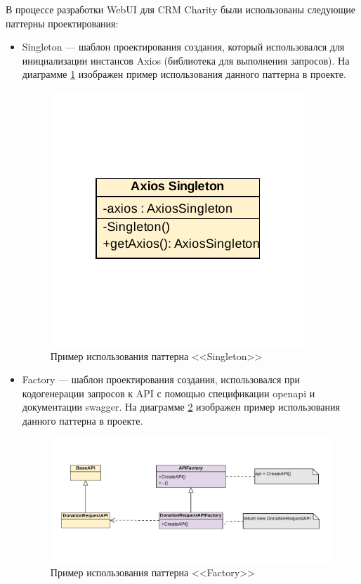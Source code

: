\documentclass[a4paper,12pt,reqno]{article}
\begin{document}
В процессе разработки WebUI для CRM Charity были использованы следующие паттерны проектирования:
\begin{itemize}
    \item Singleton — шаблон проектирования создания, который использовался для инициализации инстансов Axios\cite{axios} (библиотека для выполнения запросов). На диаграмме \ref{pic: singleton} изображен пример использования данного паттерна в проекте.
    
    \begin{figure}[H]
		\centering
		\includegraphics[width = 0.5\linewidth]{img/GoF_Singleton.pdf}
		\caption{Пример использования паттерна <<Singleton>>}
		\label{pic: singleton}
    \end{figure}

    \item Factory — шаблон проектирования создания, использовался при кодогенерации запросов к API с помощью спецификации openapi\cite{openapi} и документации swagger\cite{api}. На диаграмме \ref{pic: factory} изображен пример использования данного паттерна в проекте.
    
    \begin{figure}[H]
		\centering
		\includegraphics[width = 0.9\linewidth]{img/GoF_Factory.pdf}
		\caption{Пример использования паттерна <<Factory>>}
		\label{pic: factory}
    \end{figure}
    

\end{itemize}
\end{document}
